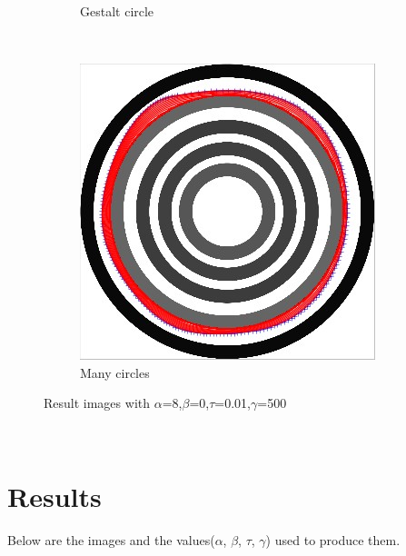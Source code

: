 \documentclass[paper=a4, fontsize=11pt]{scrartcl} %
\numberwithin{equation}{section} %
\numberwithin{figure}{section} %
\numberwithin{table}{section} %
\begin{document}
\begin{figure}[H]
\begin{subfigure}[b]{0.2\textwidth}
                \caption{Gestalt circle}
                \label{fig:Gestaltcircle}
        \end{subfigure}
        ~ %
        \begin{subfigure}[b]{0.2\textwidth}
                \includegraphics[width=\textwidth]{401}
                \caption{Many circles}
                \label{fig:Manycircles}
        \end{subfigure}
        \caption{Result images with $\alpha$=8,$\beta$=0,$\tau$=0.01,$\gamma$=500}\label{fig:resultimages}
\end{figure}
\

\section{Results}
Below are the images and the values($\alpha$, $\beta$, $\tau$, $\gamma$) used to produce them.\\
\end{document}

